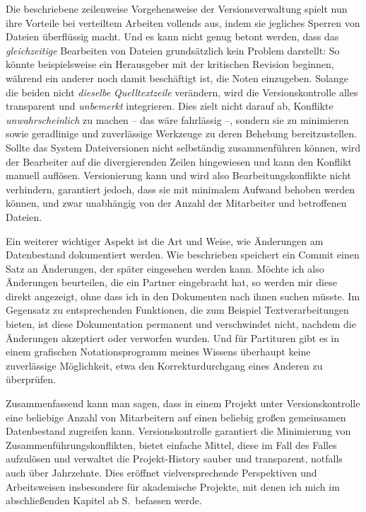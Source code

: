 \documentclass[DIV=12]{scrreprt}
\begin{document}
Die beschriebene zeilenweise Vorgehensweise der Versionsverwaltung spielt nun ihre Vorteile bei verteiltem Arbeiten vollends aus, indem sie jegliches Sperren von Dateien überflüssig macht.
Und es kann nicht genug betont werden, dass das \emph{gleichzeitige} Bearbeiten von Dateien grundsätzlich kein Problem darstellt:
So könnte beispielsweise ein Herausgeber mit der kritischen Revision beginnen, während ein anderer noch damit beschäftigt ist, die Noten einzugeben.
Solange die beiden nicht \emph{dieselbe Quelltextzeile} verändern, wird die Versionskontrolle alles transparent und \emph{unbemerkt} integrieren.
Dies zielt nicht darauf ab, Konflikte \emph{unwahrscheinlich} zu machen -- das wäre fahrlässig --, sondern sie zu minimieren sowie geradlinige und zuverlässige Werkzeuge zu deren Behebung bereitzustellen.
Sollte das System Dateiversionen nicht selbständig zusammenführen können, wird der Bearbeiter auf die divergierenden Zeilen hingewiesen und kann den Konflikt manuell auflösen.
Versionierung kann und wird also Bearbeitungskonflikte nicht verhindern, garantiert jedoch, dass sie mit minimalem Aufwand behoben werden können, und zwar unabhängig von der Anzahl der Mitarbeiter und betroffenen Dateien.

\medskip
Ein weiterer wichtiger Aspekt ist die Art und Weise, wie Änderungen am Datenbestand dokumentiert werden.
Wie beschrieben speichert ein Commit einen Satz an Änderungen, der später eingesehen werden kann.
Möchte ich also Änderungen beurteilen, die ein Partner eingebracht hat, so werden mir diese direkt angezeigt, ohne dass ich in den Dokumenten nach ihnen suchen müsste.
Im Gegensatz zu entsprechenden Funktionen, die zum Beispiel Textverarbeitungen bieten, ist diese Dokumentation permanent und verschwindet nicht, nachdem die Änderungen akzeptiert oder verworfen wurden.
Und für Partituren gibt es in einem grafischen Notationsprogramm meines Wissens überhaupt keine zuverlässige Möglichkeit, etwa den Korrekturdurchgang eines Anderen zu überprüfen.


\medskip
Zusammenfassend kann man sagen, dass in einem Projekt unter Versionskontrolle eine beliebige Anzahl von Mitarbeitern auf einen beliebig großen gemeinsamen Datenbestand zugreifen kann.
Versionskontrolle garantiert die Minimierung von Zusammenführungskonflikten, bietet einfache Mittel, diese im Fall des Falles aufzulösen und verwaltet die Projekt-History sauber und transparent, notfalls auch über Jahrzehnte.
Dies eröffnet vielversprechende Perspektiven und Arbeitsweisen insbesondere für akademische Projekte, mit denen ich mich im abschließenden Kapitel ab S.\,\pageref{chap:pt_applications} befassen werde.
\end{document}
